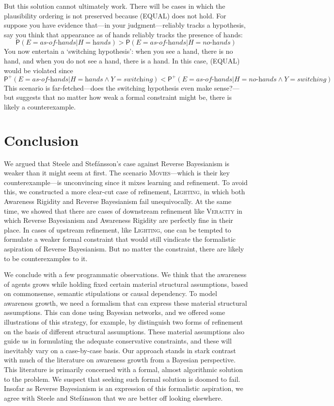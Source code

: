 \documentclass[
  11pt,
  dvipsnames,enabledeprecatedfontcommands]{scrartcl}
\newcommand{\pr}[1]{\ensuremath{\mathsf{P}(#1)}}
\newcommand{\ppr}[2]{\ensuremath{\mathsf{P}^{#1}(#2)}}
\begin{document}
But this solution cannot ultimately work. There will be cases in which
the plausibility ordering is not preserved because (EQUAL) does not
hold. For suppose you have evidence that---in your judgment---reliably
tracks a hypothesis, say you think that appearance as of hands reliably
tracks the presence of hands:
\[\pr{E=\textit{as-of-hands} \vert H=\textit{hands}} > \pr{E=\textit{as-of-hands} \vert H=\textit{no-hands}} \]
You now entertain a `switching hypothesis': when you see a hand, there
is no hand, and when you do not see a hand, there is a hand. In this
case, (EQUAL) would be violated since
\[\ppr{+}{E=\textit{as-of-hands} \vert H=\textit{hands} \wedge Y=\textit{switching}} < \ppr{+}{E=\textit{as-of-hands} \vert H=\textit{no-hands} \wedge Y=\textit{switching}}\]
This scenario is far-fetched---does the switching hypothesis even make
sense?---but suggests that no matter how weak a formal constraint might
be, there is likely a counterexample.

\hypertarget{conclusion}{%
\section{Conclusion}\label{conclusion}}

We argued that Steele and Stefánsson's case against Reverse Bayesianism
is weaker than it might seem at first. The scenario
\textsc{Movies}---which is their key counterexample---is unconvincing
since it mixes learning and refinement. To avoid this, we constructed a
more clear-cut case of refinement, \textsc{Lighting}, in which both
Awareness Rigidity and Reverse Bayesianism fail unequivocally. At the
same time, we showed that there are cases of downstream refinement like
\textsc{Veracity} in which Reverse Bayesianism and Awareness Rigidity
are perfectly fine in their place. In cases of upstream refinement, like
\textsc{Lighting}, one can be tempted to formulate a weaker formal
constraint that would still vindicate the formalistic aspiration of
Reverse Bayesianism. But no matter the constraint, there are likely to
be counterexamples to it.

We conclude with a few programmatic observations. We think that the
awareness of agents grows while holding fixed certain material
structural assumptions, based on commonsense, semantic stipulations or
causal dependency. To model awareness growth, we need a formalism that
can express these material structural assumptions. This can done using
Bayesian networks, and we offered some illustrations of this strategy,
for example, by distinguish two forms of refinement on the basis of
different structural assumptions. These material assumptions also guide
us in formulating the adequate conservative constraints, and these will
inevitably vary on a case-by-case basis. Our approach stands in stark
contrast with much of the literature on awareness growth from a Bayesian
perspective. This literature is primarily concerned with a formal,
almost algorithmic solution to the problem. We suspect that seeking such
formal solution is doomed to fail. Insofar as Reverse Bayesianism is an
expression of this formalistic aspiration, we agree with Steele and
Stefánsson that we are better off looking elsewhere.
\end{document}
